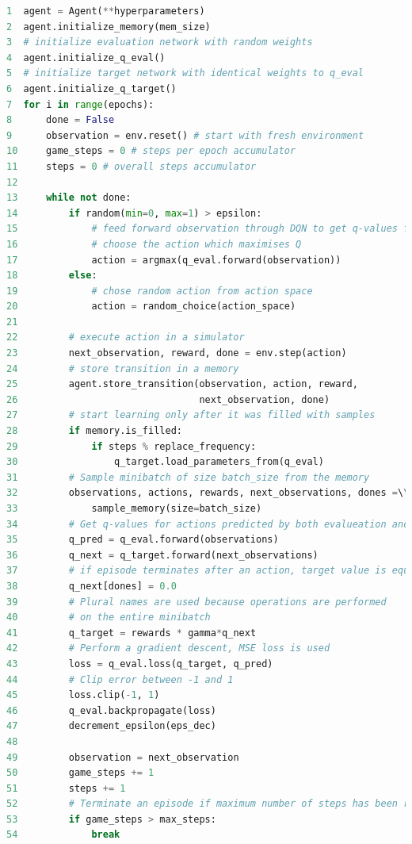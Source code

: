 \begin{lstlisting}[language=Python, caption={Main algorithm loop.}, label={lst:dqn-algo}]
1  agent = Agent(**hyperparameters)
2  agent.initialize_memory(mem_size)
3  # initialize evaluation network with random weights
4  agent.initialize_q_eval()
5  # initialize target network with identical weights to q_eval
6  agent.initialize_q_target()
7  for i in range(epochs):
8      done = False
9      observation = env.reset() # start with fresh environment
10     game_steps = 0 # steps per epoch accumulator
11     steps = 0 # overall steps accumulator
12        
13     while not done:
14         if random(min=0, max=1) > epsilon:
15             # feed forward observation through DQN to get q-values for each action
16             # choose the action which maximises Q
17             action = argmax(q_eval.forward(observation))
18         else:
19             # chose random action from action space
20             action = random_choice(action_space)
21            
22         # execute action in a simulator
23         next_observation, reward, done = env.step(action)
24         # store transition in a memory
25         agent.store_transition(observation, action, reward,
26                                next_observation, done)
27         # start learning only after it was filled with samples
28         if memory.is_filled:
29             if steps % replace_frequency:
30                 q_target.load_parameters_from(q_eval)
31         # Sample minibatch of size batch_size from the memory
32         observations, actions, rewards, next_observations, dones =\\
33             sample_memory(size=batch_size)
34         # Get q-values for actions predicted by both evalueation and target network
35         q_pred = q_eval.forward(observations)
36         q_next = q_target.forward(next_observations)
37         # if episode terminates after an action, target value is equal only to reward
38         q_next[dones] = 0.0
39         # Plural names are used because operations are performed 
40         # on the entire minibatch
41         q_target = rewards * gamma*q_next
42         # Perform a gradient descent, MSE loss is used
43         loss = q_eval.loss(q_target, q_pred)
44         # Clip error between -1 and 1
45         loss.clip(-1, 1)
46         q_eval.backpropagate(loss)
47         decrement_epsilon(eps_dec)
48              
49         observation = next_observation
50         game_steps += 1
51         steps += 1
52         # Terminate an episode if maximum number of steps has been reached
53         if game_steps > max_steps:
54             break
\end{lstlisting}

